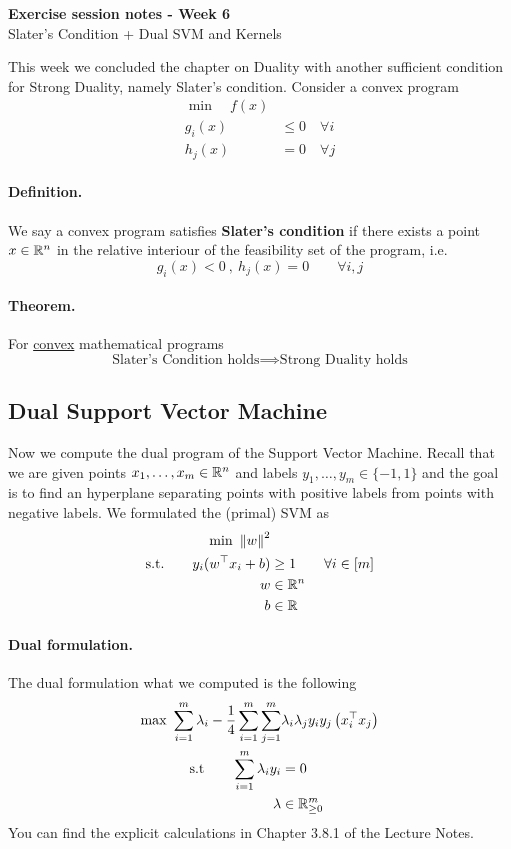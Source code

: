 \documentclass[answers]{exam}
\begin{document}
	$ $
	\begin{center}
		\huge \textbf{Exercise session notes - Week 6}  \\ \vspace*{3mm}
        \Large{Slater's Condition + Dual SVM and Kernels}
	\end{center}
	$ $\\

    \noindent This week we concluded the chapter on Duality with another sufficient condition for Strong Duality, namely Slater's condition. Consider a convex program \begin{align*}
        \min \quad f(x) & \\ 
        g_i(x) &\leq 0 \quad\forall i\\
        h_j(x) &= 0 \quad\forall j
    \end{align*}
    \paragraph{Definition.} We say a convex program satisfies \textbf{Slater's condition} if there exists a point $x\in \mathbb{R}^n$ in the relative interiour of the feasibility set of the program, i.e. 
    $$ g_i(x) < 0\ ,\ h_j(x) = 0 \quad\quad \forall i,j $$
    \paragraph{Theorem.} For \underline{convex} mathematical programs
    $$ \text{Slater's Condition holds} \implies \text{Strong Duality holds} $$

    \subsection*{Dual Support Vector Machine}

    Now we compute the dual program of the Support Vector Machine. Recall that we are given points $x_1,\ldots, x_m\in \mathbb{R}^n$ and labels $y_1,\ldots, y_m\in \{-1,1\}$ and the goal is to find an hyperplane separating points with positive labels from points with negative labels. We formulated the (primal) SVM as 
    \begin{align*}
        \min\ \left\lVert w \right\rVert^2& \\ 
        \text{s.t.}\qquad y_i(w^\top x_i + b) &\geq 1 \qquad \forall i\in [m] \\ 
        w&\in \mathbb{R}^n\\ 
        b&\in \mathbb{R}
    \end{align*}
    \paragraph{Dual formulation.} The dual formulation what we computed is the following
    \begin{align*}
        \max\ \sum_{i=1}^m\lambda_i - \frac{1}{4}\sum_{i=1}^m\sum_{j=1}^m &\lambda_i\lambda_j y_iy_j \left(x_i^\top x_j\right) \\ 
        \text{s.t}\qquad \sum_{i=1}^{m} \lambda_i y_i &= 0 \\ 
        \lambda &\in \mathbb{R}^m_{\geq 0}
    \end{align*}
    You can find the explicit calculations in Chapter 3.8.1 of the Lecture Notes.
\end{document}
